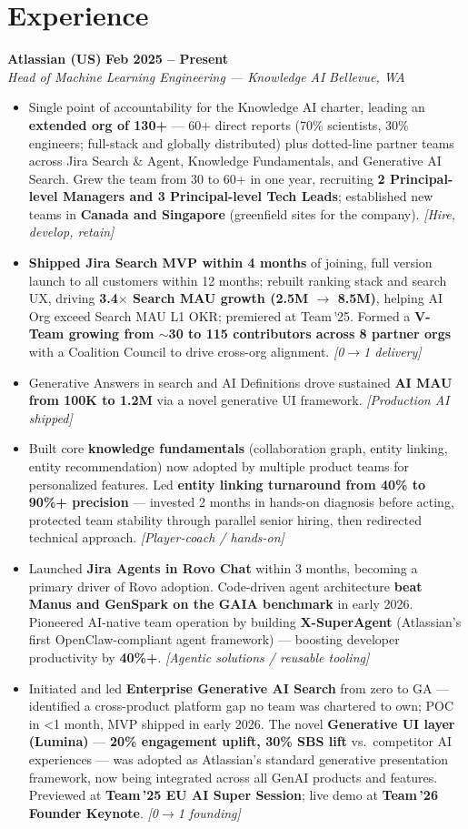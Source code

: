 \documentclass[10.5pt,letterpaper]{article}
\newcommand{\role}[4]{%
  \noindent\textbf{#1} \hfill \textbf{#3}\\
  \textit{#2} \hfill \textit{#4}\par\vspace{2pt}}
\newcommand{\lp}[1]{\textcolor{blue!55!black}{\small\textit{[#1]}}}
\begin{document}
\section*{Experience}

\role{Atlassian (US)}{Head of Machine Learning Engineering --- Knowledge AI}{Feb 2025 -- Present}{Bellevue, WA}
\begin{itemize}
  \item Single point of accountability for the Knowledge AI charter, leading an \textbf{extended org of 130+} — 60+ direct reports (70\% scientists, 30\% engineers; full-stack and globally distributed) plus dotted-line partner teams across Jira Search \& Agent, Knowledge Fundamentals, and Generative AI Search. Grew the team from 30 to 60+ in one year, recruiting \textbf{2 Principal-level Managers and 3 Principal-level Tech Leads}; established new teams in \textbf{Canada and Singapore} (greenfield sites for the company). \lp{Hire, develop, retain}
  \item \textbf{Shipped Jira Search MVP within 4 months} of joining, full version launch to all customers within 12 months; rebuilt ranking stack and search UX, driving \textbf{3.4$\times$ Search MAU growth (2.5M $\to$ 8.5M)}, helping AI Org exceed Search MAU L1 OKR; premiered at Team\,'25. Formed a \textbf{V-Team growing from $\sim$30 to 115 contributors across 8 partner orgs} with a Coalition Council to drive cross-org alignment. \lp{0$\to$1 delivery}
  \item Generative Answers in search and AI Definitions drove sustained \textbf{AI MAU from 100K to 1.2M} via a novel generative UI framework. \lp{Production AI shipped}
  \item Built core \textbf{knowledge fundamentals} (collaboration graph, entity linking, entity recommendation) now adopted by multiple product teams for personalized features. Led \textbf{entity linking turnaround from 40\% to 90\%+ precision} — invested 2 months in hands-on diagnosis before acting, protected team stability through parallel senior hiring, then redirected technical approach. \lp{Player-coach / hands-on}
  \item Launched \textbf{Jira Agents in Rovo Chat} within 3 months, becoming a primary driver of Rovo adoption. Code-driven agent architecture \textbf{beat Manus and GenSpark on the GAIA benchmark} in early 2026. Pioneered AI-native team operation by building \textbf{X-SuperAgent} (Atlassian's first OpenClaw-compliant agent framework) — boosting developer productivity by \textbf{40\%+}. \lp{Agentic solutions / reusable tooling}
  \item Initiated and led \textbf{Enterprise Generative AI Search} from zero to GA — identified a cross-product platform gap no team was chartered to own; POC in <1 month, MVP shipped in early 2026. The novel \textbf{Generative UI layer (Lumina)} — \textbf{20\% engagement uplift, 30\% SBS lift} vs.\ competitor AI experiences — was adopted as Atlassian's standard generative presentation framework, now being integrated across all GenAI products and features. Previewed at \textbf{Team\,'25 EU AI Super Session}; live demo at \textbf{Team\,'26 Founder Keynote}. \lp{0$\to$1 founding}
\end{itemize}
\end{document}

